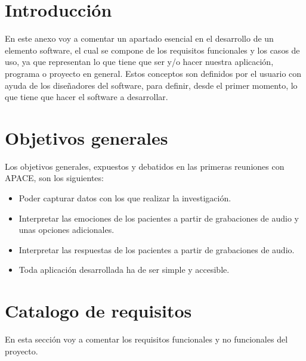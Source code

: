
\section{Introducción}
En este anexo voy a comentar un apartado esencial en el desarrollo de un elemento software, el cual se compone de los requisitos funcionales y los casos de uso, ya que representan lo que tiene que ser y/o hacer nuestra aplicación, programa o proyecto en general. Estos conceptos son definidos por el usuario con ayuda de los diseñadores del software, para definir, desde el primer momento, lo que tiene que hacer el software a desarrollar.
\section{Objetivos generales}
Los objetivos generales, expuestos y debatidos en las primeras reuniones con APACE, son los siguientes:
\begin{itemize}
	\item Poder capturar datos con los que realizar la investigación.
	\item Interpretar las emociones de los pacientes a partir de grabaciones de audio y unas opciones adicionales.
	\item Interpretar las respuestas de los pacientes a partir de grabaciones de audio.
	\item Toda aplicación desarrollada ha de ser simple y accesible.
\end{itemize}
\section{Catalogo de requisitos}
En esta sección voy a comentar los requisitos funcionales y no funcionales del proyecto.
